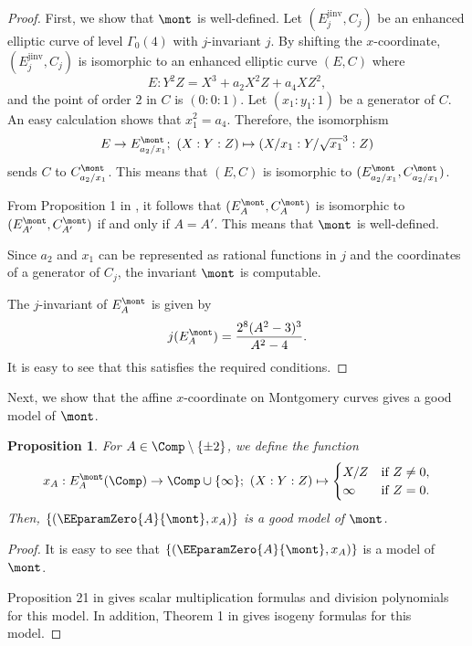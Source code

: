 \documentclass{amsart}
\newtheorem{proposition}[theorem]{Proposition}
\theoremstyle{definition}
\theoremstyle{remark}
\numberwithin{equation}{section}
\begin{document}
\begin{proof}
    First, we show that $\mont$ is well-defined.
    Let $(E^\mathrm{jinv}_j, C_j)$ be an enhanced elliptic curve of level $\Gamma_0(4)$
    with $j$-invariant $j$.
    By shifting the $x$-coordinate,
    $(E^\mathrm{jinv}_j, C_j)$ is isomorphic to
    an enhanced elliptic curve $(E, C)$
    where
    \begin{equation*}
        E : Y^2 Z = X^3 + a_2 X^2 Z + a_4 XZ^2,
    \end{equation*}
    and the point of order $2$ in $C$ is $(0 : 0 : 1)$.
    Let $(x_1 : y_1 : 1)$ be a generator of $C$.
    An easy calculation shows that $x_1^2 = a_4$.
    Therefore, the isomorphism
    \begin{equation*}
        E \to E_{a_2/x_1}^\mont;\ (X : Y : Z) \mapsto (X/x_1 : Y/\sqrt{x_1}^3 : Z)
    \end{equation*}
    sends $C$ to $C_{a_2/x_1}^\mont$.
    This means that $(E, C)$ is isomorphic to $(E_{a_2/x_1}^\mont, C_{a_2/x_1}^\mont)$.
    
    From Proposition 1 in \cite{PKC:OnuMor22},
    it follows that
    $(E_A^\mont, C_A^\mont)$ is isomorphic to $(E_{A'}^\mont, C_{A'}^\mont)$
    if and only if $A = A'$.
    This means that $\mont$ is well-defined.

    Since $a_2$ and $x_1$ can be represented
    as rational functions in $j$ and the coordinates of a generator of $C_j$,
    the invariant $\mont$ is computable.

    The $j$-invariant of $E_A^\mont$ is given by
    \begin{equation*}
        j(E_A^\mont) = \frac{2^8(A^2 - 3)^3}{A^2 - 4}.
    \end{equation*}
    It is easy to see that this satisfies the required conditions.
\end{proof}
Next, we show that the affine $x$-coordinate on Montgomery curves
gives a good model of $\mont$.
\begin{proposition}
    For $A \in \Comp \setminus \{\pm 2\}$,
    we define the function
    \begin{equation*}
        x_A : E_A^\mont(\Comp) \to \Comp \cup \{\infty\};\
        (X : Y : Z) \mapsto
        \begin{cases}
            X/Z & \text{if } Z \neq 0,\\
            \infty & \text{if } Z = 0.
        \end{cases}
    \end{equation*}
    Then, $\{(\EEparamZero{A}{\mont}, x_A)\}$
    is a good model of $\mont$.
\end{proposition}
\begin{proof}
    It is easy to see that
    $\{(\EEparamZero{A}{\mont}, x_A)\}$
    is a model of $\mont$.

    Proposition 21 in \cite{MOAT2022gen_montgomery}
    gives scalar multiplication formulas
    and division polynomials for this model.
    In addition,
    Theorem 1 in \cite{AC:CosHis17} gives isogeny formulas for this model.
\end{proof}
\end{document}
